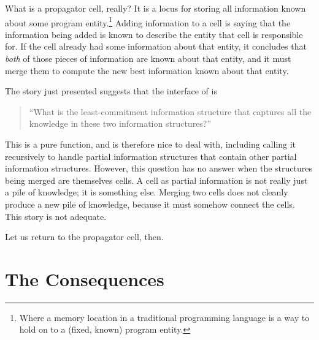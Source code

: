 \documentclass[12pt,letterpaper]{article}
\begin{document}
What is a propagator cell, really?  It is a locus for storing all
information known about some program entity.\footnote{Where a memory
  location in a traditional programming language is a way to hold on
  to a (fixed, known) program entity.}  Adding information to a cell
is saying that the information being added is known to describe the
entity that cell is responsible for.  If the cell already had some
information about that entity, it concludes that \emph{both} of those
pieces of information are known about that entity, and it must merge
them to compute the new best information known about that entity.

The story just presented suggests that the interface of 
is
\begin{quote}
``What is the least-commitment information structure that captures
all the knowledge in these two information structures?''
\end{quote}
This is a pure function, and is therefore nice to deal with, including
calling it recursively to handle partial information structures that
contain other partial information structures.  However, this question
has no answer when the structures being merged are themselves cells.
A cell as partial information is not really just a pile of knowledge;
it is something else.  Merging two cells does not cleanly produce a
new pile of knowledge, because it must somehow connect the cells.
This story is not adequate.

Let us return to the propagator cell, then.

\section{The Consequences}
\end{document}
